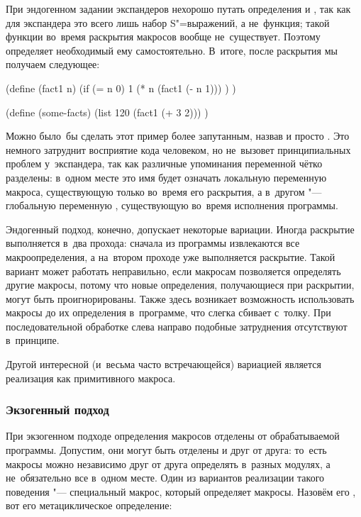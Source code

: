 При эндогенном задании экспандеров нехорошо путать определения  и
, так как  для экспандера это всего лишь набор
S"=выражений, а не~функция; такой функции во~время раскрытия макросов вообще
не~существует. Поэтому  определяет необходимый ему 
самостоятельно. В~итоге, после раскрытия мы получаем следующее:

\begin{code:lisp-framed}[title={\snippet{si/chap9b.escm}}]
(define (fact1 n)
  (if (= n 0) 1
      (* n (fact1 (- n 1))) ) )

(define (some-facts)
  (list 120 (fact1 (+ 3 2))) )
\end{code:lisp-framed}

Можно было~бы сделать этот пример более запутанным, назвав  и
 просто . Это немного затруднит восприятие кода
 человеком, но не~вызовет принципиальных проблем у~экспандера, так
как различные упоминания переменной  чётко разделены: в~одном месте
это имя будет означать локальную переменную макроса, существующую только
во~время его раскрытия, а в~другом "--- глобальную переменную ,
существующую во~время исполнения программы.

Эндогенный подход, конечно, допускает некоторые вариации. Иногда раскрытие
выполняется в~два прохода: сначала из программы извлекаются все
макроопределения, а на~втором проходе уже выполняется раскрытие. Такой вариант
может работать неправильно, если макросам позволяется определять другие макросы,
потому что новые определения, получающиеся при раскрытии, могут быть
проигнорированы. Также здесь возникает возможность использовать макросы до их
определения в~программе, что слегка сбивает с~толку. При последовательной
обработке слева направо подобные затруднения отсутствуют в~принципе.

Другой интересной (и~весьма часто встречающейся) вариацией является реализация
 как примитивного макроса.


\subsubsection{Экзогенный подход}\label{macros/define/multiple/sssect:exogeny}

При экзогенном подходе определения макросов отделены от обрабатываемой
программы. Допустим, они могут быть отделены и друг от друга: то~есть макросы
можно независимо друг от друга определять в~разных модулях, а не~обязательно все
в~одном месте. Один из вариантов реализации такого поведения "--- специальный
макрос, который определяет макросы. Назовём его , вот
его метациклическое определение:

